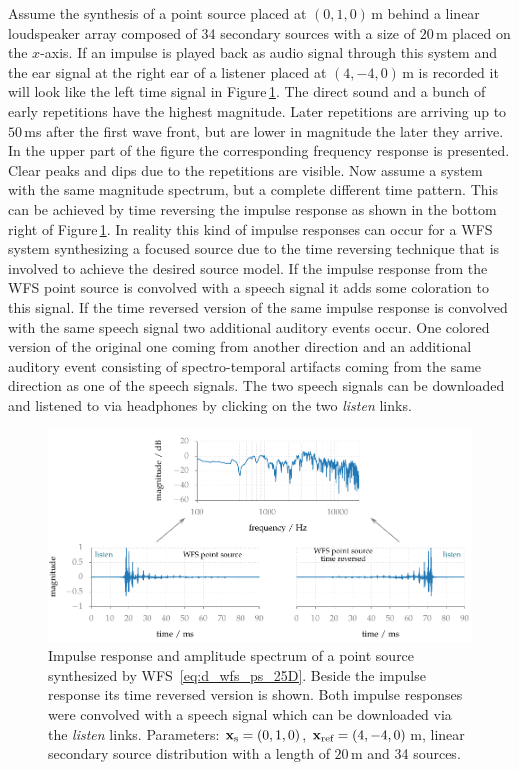 Assume the synthesis of a point source placed at $(0,1,0)$\,m
behind a linear loudspeaker array composed of 34 secondary sources with a size
of $20$\,m placed on the $x$-axis.
If an impulse is played back as audio signal through this system and
the ear signal at the right ear of a listener placed at $(4,-4,0)$\,m is recorded
it will look like the left time signal in Figure\,\ref{fig:wfs_artifacts}. The
direct sound and a bunch of early repetitions have the highest magnitude.
Later repetitions are arriving up to $50$\,ms after the first wave front, but
are lower in magnitude the later they arrive. In the upper part of the
figure the corresponding frequency response is
presented. Clear peaks and dips due to the repetitions are visible. Now
assume a system with the same magnitude spectrum, but a complete different time
pattern. This can be achieved by time reversing the impulse response as shown in
the bottom right of Figure\,\ref{fig:wfs_artifacts}. In reality this kind of
impulse responses can occur for a \ac{WFS} system synthesizing a focused source due
to the time reversing technique that is involved to achieve the desired source
model. If the impulse response from the \ac{WFS} point source is convolved
with a speech signal it adds some coloration to this signal. If the time
reversed version of the same impulse response is convolved with the same
speech signal two additional auditory events occur. One colored version of the
original one coming from another direction and an additional auditory event
consisting of spectro-temporal artifacts coming from the same direction as one of the speech
signals. The two speech signals can be downloaded and listened to via headphones
by clicking on the two \emph{listen} links.

\begin{figure}[t]
    \centering
    \includegraphics{fig5_12/fig5_12}
    \caption{Impulse response and amplitude spectrum of a point source
    synthesized by \ac{WFS}~\protect\eqref{eq:d_wfs_ps_25D}. Beside the impulse
    response its time reversed version is shown. Both impulse responses were
    convolved with a speech signal which can be downloaded via the \emph{listen}
    links.
    Parameters: $\mathbf{x}_\text{s} = (0,1,0)$, $\mathbf{x}_\text{ref} = (4,-4,0)$\,m, linear secondary source
    distribution with a length of $20$\,m and 34 sources.
    }
    \label{fig:wfs_artifacts}
\end{figure}

